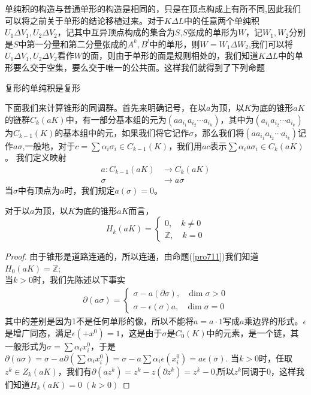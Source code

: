 单纯积的构造与普通单形的构造是相同的，只是在顶点构成上有所不同,因此我们可以将之前关于单形的结论移植过来。对于$K\Delta L$中的任意两个单纯积$U_{1}\Delta V_{1},U_{2}\Delta V_{2}$，记其中互异顶点构成的集合为$S$,$S$张成的单形为$W$，记$W_{1},W_{2}$分别是$S$中第一分量和第二分量张成的$A^{k},B^{l}$中的单形，则$W=W_{1}\Delta W_{2}$,我们可以将$U_{1}\Delta V_{1},U_{2}\Delta V_{2}$看作$W$的面，则由于单形的面是规则相处的，我们知道$K\Delta L$中的单形要么交于空集，要么交于唯一的公共面。这样我们就得到了下列命题
\begin{proposition}
复形的单纯积是复形
\end{proposition}
下面我们来计算锥形的同调群。首先来明确记号，在以$a$为顶，以$K$为底的锥形$aK$的链群$C_{k}(aK)$中，有一部分基本组的元为$(aa_{i_{1}}a_{i_{2}}\cdots a_{i_{k}})$，其中为$(a_{i_{1}}a_{i_{2}}\cdots a_{i_{k}})$为$C_{k-1}(K)$的基本组中的元，如果我们将它记作$\sigma$，那么我们将$(aa_{i_{1}}a_{i_{2}}\cdots a_{i_{k}})$记作$a\sigma$,一般地，对于$c=\sum\alpha_{i}\sigma_{i}\in C_{k-1}(K)$，我们用$ac$表示$\sum\alpha_{i}a\sigma_{i}\in C_{k}(aK)$。
我们定义映射
\begin{equation*}
    \begin{aligned}
    a:C_{k-1}(aK)&\rightarrow C_{k}(aK)\\
    \sigma&\rightarrow a\sigma
    \end{aligned}
\end{equation*}
当$\sigma$中有顶点为$a$时，我们规定$a(\sigma)=0$。
\begin{proposition}
对于以$a$为顶，以$K$为底的锥形$aK$而言，
\begin{equation*}\label{pro1313}
    H_{k}(aK)=\left\{\begin{array}{cc}
         0,\quad k\neq 0  \\
         \mathbb{Z},\quad k=0 
    \end{array}\right.
\end{equation*}
\end{proposition}
\begin{proof}
由于锥形是道路连通的，所以连通，由命题(\ref{pro711})我们知道$H_{0}(aK)=\mathbb{Z}$;\\
当$k>0$时，我们先陈述以下事实
\begin{equation*}
    \begin{aligned}
    \partial(a\sigma)=\left\{\begin{array}{cc}
         \sigma-a(\partial \sigma),\quad \text{dim}\;\sigma>0  \\
         \sigma-\epsilon(\sigma)a, \quad \text{dim}\;\sigma=0 
    \end{array}\right.
    \end{aligned}
\end{equation*}
其中的差别是因为1不是任何单形的像，所以不能将$a=a\cdot 1$写成$a$乘边界的形式。$\epsilon$是增广同态，满足$\epsilon(+x^{0})=1$，这是由于$\sigma$是$C_{0}(K)$中的元素，是一个链，其一般形式为$\sigma=\sum \alpha_{i}x^{0}_{i}$，于是$\partial(a\sigma)=\sigma-a\partial(\sum\alpha_{i}x^{0}_{i})=\sigma-a\sum\alpha_{i}\epsilon(x^{0}_{i})=a\epsilon(\sigma)$.
当$k>0$时，任取$z^{k}\in Z_{k}(aK)$，我们有$\partial(az^{k})=z^{k}-z(\partial z^{k})=z^{k}-0$,所以$z^{k}$同调于0，这样我们知道$H_{k}(aK)=0\;(k>0)$
\end{proof}
